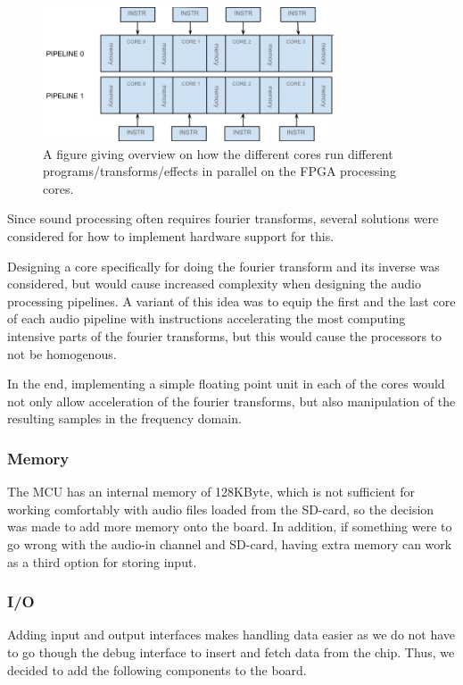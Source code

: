 \begin{figure}[H]
    \centering
    \includegraphics[height=150px]{figures/fpga/system_components_general_pipeline_without_programs.png}
    \caption{A figure giving overview on how the different cores run
different programs/transforms/effects in parallel on the FPGA processing cores.}
    \label{fig:general_pipeline}
\end{figure}

Since sound processing often requires fourier transforms, several solutions were
considered for how to implement hardware support for this.

Designing a core specifically for doing the fourier transform and its inverse
was considered, but would cause increased complexity when designing the audio
processing pipelines. A variant of this idea was to equip the first and the last
core of each audio pipeline with instructions accelerating the most computing
intensive parts of the fourier transforms, but this would cause the processors
to not be homogenous.

In the end, implementing a simple floating point unit in each of the cores
would not only allow acceleration of the fourier transforms, but also
manipulation of the resulting samples in the frequency domain.

\subsubsection{Memory}
The MCU has an internal memory of 128KByte, which is not sufficient for working
comfortably with audio files loaded from the SD-card, so the decision was made
to add more memory onto the board. In addition, if something were to go wrong
with the audio-in channel and SD-card, having extra memory can work as a third
option for storing input.

\subsubsection{I/O}
Adding input and output interfaces makes handling data easier as we do not have
to go though the debug interface to insert and fetch data from the chip. Thus,
we decided to add the following components to the board.

